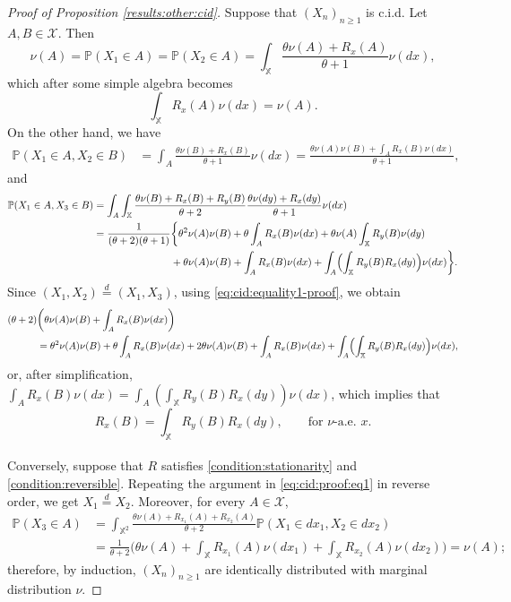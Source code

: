 \documentclass[a4paper]{article}
\theoremstyle{plain}
\theoremstyle{remark}
\theoremstyle{definition}
\begin{document}
\begin{proof}[Proof of Proposition \ref{results:other:cid}]
Suppose that $(X_n)_{n\geq1}$ is c.i.d. Let $A,B\in\mathcal{X}$. Then
\begin{equation}\label{eq:cid:proof:eq1}
\nu(A)=\mathbb{P}(X_1\in A)=\mathbb{P}(X_2\in A)=\int_\mathbb{X}\frac{\theta\nu(A)+R_x(A)}{\theta+1}\nu(dx),
\end{equation}
which after some simple algebra becomes
\begin{equation}\label{eq:cid:equality1-proof}
\int_\mathbb{X}R_x(A)\nu(dx)=\nu(A).
\end{equation}
On the other hand, we have
\begingroup\allowdisplaybreaks
\begin{align*}
\mathbb{P}(X_1\in A,X_2\in B)&=\int_A\frac{\theta\nu(B)+R_x(B)}{\theta+1}\nu(dx)=\frac{\theta\nu(A)\nu(B)+\int_AR_x(B)\nu(dx)}{\theta+1},
\end{align*}
\endgroup
and
\begingroup\allowdisplaybreaks
\begin{align*}
\mathbb{P}(X_1\in A,X_3\in B)&=\int_A\int_\mathbb{X}\frac{\theta\nu(B)+R_x(B)+R_y(B)}{\theta+2}\frac{\theta\nu(dy)+R_x(dy)}{\theta+1}\nu(dx)\\
&\begin{aligned}\;=\frac{1}{(\theta+2)(\theta+1)}&\biggl\{\theta^2\nu(A)\nu(B)+\theta\int_AR_x(B)\nu(dx)+\theta\nu(A)\int_\mathbb{X}R_y(B)\nu(dy)\\
&+\theta\nu(A)\nu(B)+\int_AR_x(B)\nu(dx)+\int_A\Bigl(\int_\mathbb{X}R_y(B)R_x(dy)\Bigr)\nu(dx)\biggr\}.\end{aligned}
\end{align*}
\endgroup
Since $(X_1,X_2)\overset{d}{=}(X_1,X_3)$, using \eqref{eq:cid:equality1-proof}, we obtain
\begingroup\allowdisplaybreaks
\begin{align*}
(\theta+2)&\biggl(\theta\nu(A)\nu(B)+\int_AR_x(B)\nu(dx)\biggr)\\
&=\theta^2\nu(A)\nu(B)+\theta\int_AR_x(B)\nu(dx)+2\theta\nu(A)\nu(B)+\int_AR_x(B)\nu(dx)+\int_A\Bigl(\int_\mathbb{X}R_y(B)R_x(dy)\Bigr)\nu(dx),
\end{align*}
\endgroup
or, after simplification, $\int_AR_x(B)\nu(dx)=\int_A(\int_\mathbb{X}R_y(B)R_x(dy))\nu(dx)$,
which implies that
\[R_x(B)=\int_\mathbb{X}R_y(B)R_x(dy),\qquad\mbox{for }\nu\mbox{-a.e. }x.\]\\

Conversely, suppose that $R$ satisfies \eqref{condition:stationarity} and \eqref{condition:reversible}. Repeating the argument in \eqref{eq:cid:proof:eq1} in reverse order, we get $X_1\overset{d}{=}X_2$. Moreover, for every $A\in\mathcal{X}$,
\begingroup\allowdisplaybreaks
\begin{align*}
\mathbb{P}(X_3\in A)&=\int_{\mathbb{X}^2}\frac{\theta\nu(A)+R_{x_1}(A)+R_{x_2}(A)}{\theta+2}\mathbb{P}(X_1\in dx_1,X_2\in dx_2)\\
&=\frac{1}{\theta+2}\biggl(\theta\nu(A)+\int_\mathbb{X}R_{x_1}(A)\nu(dx_1)+\int_\mathbb{X}R_{x_2}(A)\nu(dx_2)\biggr)=\nu(A);
\end{align*}
\endgroup
therefore, by induction, $(X_n)_{n\geq1}$ are identically distributed with marginal distribution $\nu$.


\end{proof}
\end{document}
